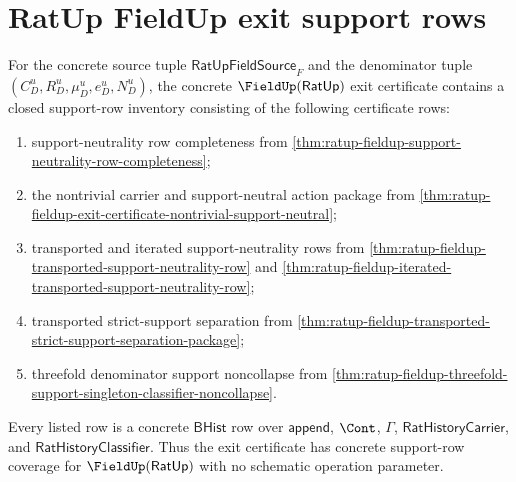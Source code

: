 \section{RatUp FieldUp exit support rows}
\label{sec:field-ratup-fieldup-exit-support-rows}

\begin{theorem}
\label{thm:ratup-fieldup-exit-support-row-inventory}
For the concrete source tuple $\mathsf{RatUpFieldSource}_F$ and the
denominator tuple $(C_D^u,R_D^u,\mu_D^u,e_D^u,N_D^u)$, the concrete
$\FieldUp(\mathsf{RatUp})$ exit certificate contains a closed support-row
inventory consisting of the following certificate rows:
\begin{enumerate}
  \item support-neutrality row completeness from
  \autoref{thm:ratup-fieldup-support-neutrality-row-completeness};
  \item the nontrivial carrier and support-neutral action package from
  \autoref{thm:ratup-fieldup-exit-certificate-nontrivial-support-neutral};
  \item transported and iterated support-neutrality rows from
  \autoref{thm:ratup-fieldup-transported-support-neutrality-row} and
  \autoref{thm:ratup-fieldup-iterated-transported-support-neutrality-row};
  \item transported strict-support separation from
  \autoref{thm:ratup-fieldup-transported-strict-support-separation-package};
  \item threefold denominator support noncollapse from
  \autoref{thm:ratup-fieldup-threefold-support-singleton-classifier-noncollapse}.
\end{enumerate}
Every listed row is a concrete $\mathsf{BHist}$ row over $\mathsf{append}$,
$\Cont$, $\Gamma$, $\mathsf{RatHistoryCarrier}$, and
$\mathsf{RatHistoryClassifier}$. Thus the exit certificate has concrete
support-row coverage for $\FieldUp(\mathsf{RatUp})$ with no schematic operation
parameter.
\end{theorem}
